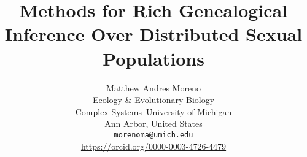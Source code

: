 \title{Methods for Rich Genealogical Inference Over Distributed Sexual Populations}

\author{
Matthew Andres Moreno\\
Ecology \& Evolutionary Biology\\
Complex Systems\
University of Michigan\\
Ann Arbor, United States \\
\texttt{morenoma@umich.edu} \\
\url{https://orcid.org/0000-0003-4726-4479} \\
}

\maketitle
